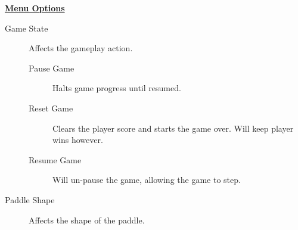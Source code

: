 \documentclass[10pt]{report}
\begin{document}
\noindent\underline{\textbf{Menu Options}}
\begin{description}
\item[Game State] Affects the gameplay action.
   \begin{description}
   \item[Pause Game] Halts game progress until resumed.
   \item[Reset Game] Clears the player score and starts the game over.
                     Will keep player wins however.
   \item[Resume Game] Will un-pause the game, allowing the game to step.
   \end{description}
\item[Paddle Shape] Affects the shape of the paddle.
\end{description}
\end{document}
